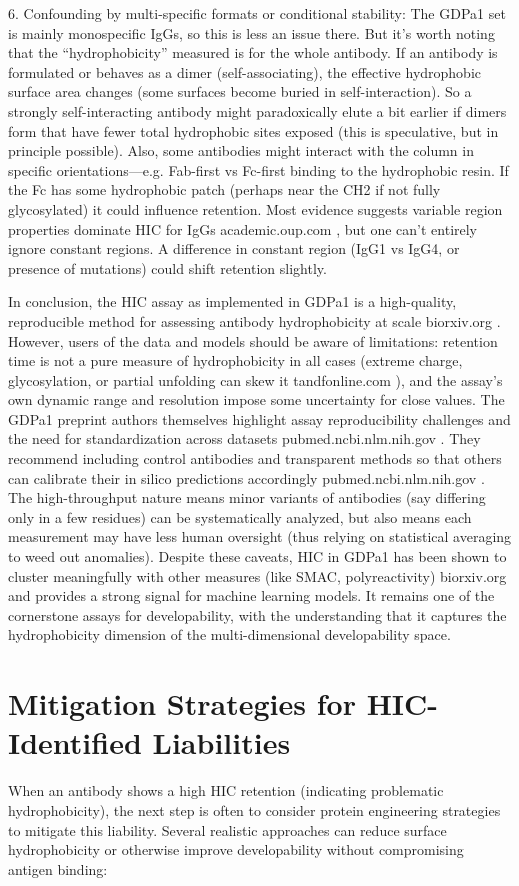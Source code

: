 \documentclass[12pt]{article}
\begin{document}
6. Confounding by multi-specific formats or conditional stability: The GDPa1 set is mainly monospecific IgGs, so this is less an issue there. But it’s worth noting that the “hydrophobicity” measured is for the whole antibody. If an antibody is formulated or behaves as a dimer (self-associating), the effective hydrophobic surface area changes (some surfaces become buried in self-interaction). So a strongly self-interacting antibody might paradoxically elute a bit earlier if dimers form that have fewer total hydrophobic sites exposed (this is speculative, but in principle possible). Also, some antibodies might interact with the column in specific orientations—e.g. Fab-first vs Fc-first binding to the hydrophobic resin. If the Fc has some hydrophobic patch (perhaps near the CH2 if not fully glycosylated) it could influence retention. Most evidence suggests variable region properties dominate HIC for IgGs
academic.oup.com
, but one can’t entirely ignore constant regions. A difference in constant region (IgG1 vs IgG4, or presence of mutations) could shift retention slightly.

In conclusion, the HIC assay as implemented in GDPa1 is a high-quality, reproducible method for assessing antibody hydrophobicity at scale
biorxiv.org
. However, users of the data and models should be aware of limitations: retention time is not a pure measure of hydrophobicity in all cases (extreme charge, glycosylation, or partial unfolding can skew it
tandfonline.com
), and the assay’s own dynamic range and resolution impose some uncertainty for close values. The GDPa1 preprint authors themselves highlight assay reproducibility challenges and the need for standardization across datasets
pubmed.ncbi.nlm.nih.gov
. They recommend including control antibodies and transparent methods so that others can calibrate their in silico predictions accordingly
pubmed.ncbi.nlm.nih.gov
. The high-throughput nature means minor variants of antibodies (say differing only in a few residues) can be systematically analyzed, but also means each measurement may have less human oversight (thus relying on statistical averaging to weed out anomalies). Despite these caveats, HIC in GDPa1 has been shown to cluster meaningfully with other measures (like SMAC, polyreactivity)
biorxiv.org
 and provides a strong signal for machine learning models. It remains one of the cornerstone assays for developability, with the understanding that it captures the hydrophobicity dimension of the multi-dimensional developability space.

\section{Mitigation Strategies for HIC-Identified Liabilities}
When an antibody shows a high HIC retention (indicating problematic hydrophobicity), the next step is often to consider protein engineering strategies to mitigate this liability. Several realistic approaches can reduce surface hydrophobicity or otherwise improve developability without compromising antigen binding:
\end{document}
